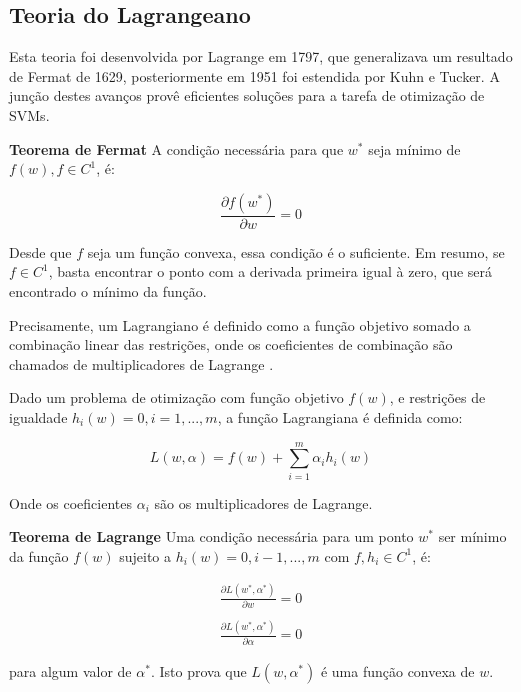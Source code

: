 \subsection{Teoria do Lagrangeano}\label{Teot:S2}

Esta teoria foi desenvolvida por Lagrange em 1797, que generalizava um resultado de Fermat de 1629, posteriormente em 1951 foi estendida por Kuhn e Tucker. A junção destes avanços provê eficientes soluções para a tarefa de otimização de SVMs.

\textbf{Teorema de Fermat} A condição necessária para que $w^*$ seja mínimo de $f(w), f \in C^1$, é:

\begin{equation} \label{Teot:E4}
\frac{\partial f(w^*)}{\partial w} = 0
\end{equation}

Desde que $f$ seja um função convexa, essa condição é o suficiente. Em resumo, se $f \in C^1$, basta encontrar o ponto com a derivada primeira igual à zero, que será encontrado o mínimo da função.

Precisamente, um Lagrangiano é definido como a função objetivo somado a combinação linear das restrições, onde os coeficientes de combinação são chamados de multiplicadores de Lagrange \cite{Cristianini2000}. 

Dado um problema de otimização com função objetivo $f(w)$, e restrições de igualdade $h_{i}(w) = 0, i=1,...,m$, a função Lagrangiana é definida como:

\begin{equation}\label{Teot:E5}
L(w,\alpha) = f(w) + \sum_{i=1}^m \alpha_{i} h_{i}(w)
\end{equation}

Onde os coeficientes $\alpha_{i}$ são os multiplicadores de Lagrange.

\textbf{Teorema de Lagrange} Uma condição necessária para um ponto $w^*$ ser mínimo da função $f(w)$ sujeito a $h_{i}(w) = 0, i-1,...,m$ com $f,h_{i} \in C^1$, é:

\begin{equation} \label{Teot:E6}
\begin{matrix}
\frac{\partial L(w^*, \alpha^*)}{\partial w}  = 0 \\ \\
\frac{\partial L(w^*, \alpha^*)}{\partial \alpha} = 0
\end{matrix}
\end{equation}

para algum valor de $\alpha^*$. Isto prova que $L(w,\alpha^*)$ é uma função convexa de $w$.


